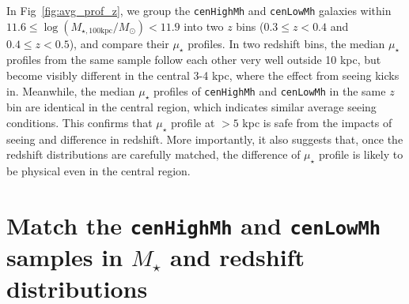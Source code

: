\documentclass[a4paper,fleqn,usenatbib]{mnras}
\def\rbcg{\texttt{cenHighMh}}
\def\nbcg{\texttt{cenLowMh}}
\def\mstar{{$M_{\star}$}}
\def\logmtot{{$\log (M_{\star,100\mathrm{kpc}}/M_{\odot})$}}
\def\mden{{$\mu_{\star}$}}
\begin{document}
    In Fig~\ref{fig:avg_prof_z}, we group the \rbcg{} and \nbcg{} galaxies within 
    $11.6 \le$\logmtot$< 11.9$ into two $z$ bins ($0.3\leq z<0.4$ and $0.4\leq z<0.5$),
    and compare their \mden{} profiles. 
    In two redshift bins, the median \mden{} profiles from the same sample follow each 
    other very well outside 10 kpc, but become visibly different in the central 3-4 kpc,
    where the effect from seeing kicks in. 
    Meanwhile, the median \mden{} profiles of \rbcg{} and \nbcg{} in the same $z$ bin 
    are identical in the central region, which indicates similar average seeing 
    conditions.       
    This confirms that \mden{} profile at $> 5$ kpc is safe from the impacts of seeing 
    and difference in redshift.
    More importantly, it also suggests that, once the redshift distributions are 
    carefully matched, the difference of \mden{} profile is likely to be physical 
    even in the central region.  



\section{Match the \rbcg{} and \nbcg{} samples in \mstar{} and redshift distributions}
    \label{app:match}
    
\end{document}
